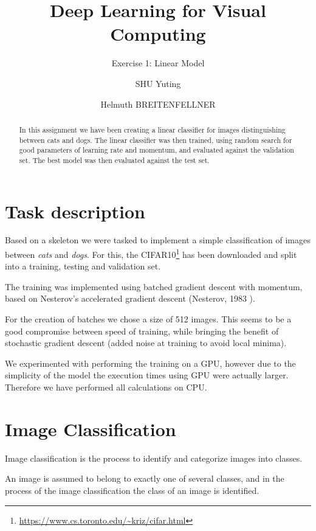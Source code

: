 \documentclass[sigconf,nonacm]{acmart}
\begin{document}
\title{Deep Learning for Visual Computing}
\subtitle{Exercise 1: Linear Model}
\author{SHU Yuting}
\author{Helmuth BREITENFELLNER}
\begin{abstract}
In this assignment we have been creating a linear classifier for images
distinguishing between cats and dogs.
The linear classifier was then trained, using random search for good
parameters of learning rate and momentum, and evaluated against the
validation set.
The best model was then evaluated against the test set.
\end{abstract}
\maketitle
\section{Task description}
Based on a skeleton we were tasked to implement a simple classification
of images between \emph{cats} and \emph{dogs}.
For this, the CIFAR10\footnote{\url{https://www.cs.toronto.edu/~kriz/cifar.html}}
has been downloaded and split into a training, testing and validation
set.

The training was implemented using batched gradient descent with
momentum, based on Nesterov's accelerated gradient descent
(Nesterov, 1983 \cite{Nes83}).

For the creation of batches we chose a size of 512 images.
This seems to be a good compromise between speed of training,
while bringing the benefit of stochastic gradient descent
(added noise at training to avoid local minima).

We experimented with performing the training on a GPU,
however due to the simplicity of the model the execution times using
GPU were actually larger.
Therefore we have performed all calculations on CPU.

\section{Image Classification}

Image classification is the process to identify and categorize images
into classes.

An image is assumed to belong to exactly one of several classes, and
in the process of the image classification the class of an image
is identified.
\end{document}
